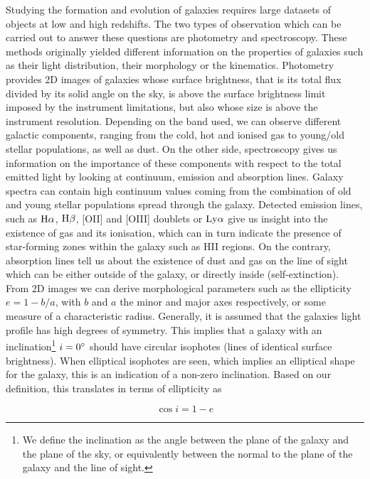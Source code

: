 Studying the formation and evolution of galaxies requires large datasets of objects at low and high redshifts. The two types of observation which can be carried out to answer these questions are photometry and spectroscopy. These methods originally yielded different information on the properties of galaxies such as their light distribution, their morphology or the kinematics.
Photometry provides 2D images of galaxies whose surface brightness, that is its total flux divided by its solid angle on the sky, is above the surface brightness limit imposed by the instrument limitations, but also whose size is above the instrument resolution. Depending on the band used, we can observe different galactic components, ranging from the cold, hot and ionised gas to young/old stellar populations, as well as dust.
On the other side, spectroscopy gives us information on the importance of these components with respect to the total emitted light by looking at continuum, emission and absorption lines. Galaxy spectra can contain high continuum values coming from the combination of old and young stellar populations spread through the galaxy. Detected emission lines, such as $\rm{H}{\alpha}$, $\rm{H}{\beta}$, [OII] and [OIII] doublets or $\rm{Ly}\alpha$ give us insight into the existence of gas and its ionisation, which can in turn indicate the presence of star-forming zones within the galaxy such as HII regions. On the contrary, absorption lines tell us about the existence of dust and gas on the line of sight which can be either outside of the galaxy, or directly inside (self-extinction). \\
      
From 2D images we can derive morphological parameters such as the ellipticity $e = 1 - b/a$, with $b$ and $a$ the minor and major axes respectively, or some measure of a characteristic radius. Generally, it is assumed that the galaxies light profile has high degrees of symmetry. This implies that a galaxy with an inclination\footnote{We define the inclination as the angle between the plane of the galaxy and the plane of the sky, or equivalently between the normal to the plane of the galaxy and the line of sight.} $i = 0 \degree$ should have circular isophotes (lines of identical surface brightness). When elliptical isophotes are seen, which implies an elliptical shape for the galaxy, this is an indication of a non-zero inclination. Based on our definition, this translates in terms of ellipticity as

\begin{equation}
	\cos i = 1 - e
	\label{eq:inclinaison}
\end{equation}

